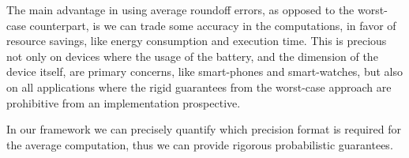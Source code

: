 The main advantage in using average roundoff errors, as opposed to the worst-case counterpart, is we can trade some accuracy in the computations, in favor of resource savings, like energy consumption and execution time.
%
This is precious not only on devices where the usage of the battery, and the dimension of the device itself, are primary concerns, like smart-phones and smart-watches, but also on all applications where the rigid guarantees from the worst-case approach are prohibitive from an implementation prospective.
%

In our framework we can precisely quantify which precision format is required for the average computation, thus we can provide rigorous probabilistic guarantees.
%